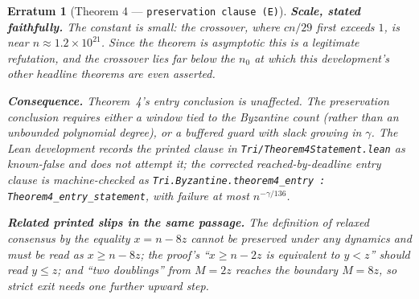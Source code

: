 \documentclass[11pt]{article}
\theoremstyle{erratumstyle}
\newtheorem{erratum}{Erratum}
\begin{document}
\begin{erratum}[Theorem 4 --- \texttt{preservation clause (E)}]
\medskip
\textbf{Scale, stated faithfully.} The constant is small: the crossover, where
$cn/29$ first exceeds $1$, is near $n \approx 1.2\times10^{21}$. Since the
theorem is asymptotic this is a legitimate refutation, and the crossover lies
far below the $n_0$ at which this development's other headline theorems are
even asserted.

\medskip
\textbf{Consequence.} Theorem~4's \emph{entry} conclusion is unaffected. The
preservation conclusion requires either a window tied to the Byzantine count
(rather than an unbounded polynomial degree), or a buffered guard with slack
growing in $\gamma$. The Lean development records the printed clause in
\texttt{Tri/Theorem4Statement.lean} as known-false and does not attempt it;
the corrected reached-by-deadline entry clause is machine-checked as
\texttt{Tri.Byzantine.theorem4\_entry :
Theorem4\_entry\_statement}, with failure at most $n^{-\gamma/136}$.

\medskip
\textbf{Related printed slips in the same passage.} The definition of relaxed
consensus by the \emph{equality} $x = n-8z$ cannot be preserved under any
dynamics and must be read as $x \ge n-8z$; the proof's ``$x \ge n-2z$ is
equivalent to $y < z$'' should read $y \le z$; and ``two doublings'' from
$M = 2z$ reaches the boundary $M = 8z$, so strict exit needs one further
upward step.
\end{erratum}
\end{document}
